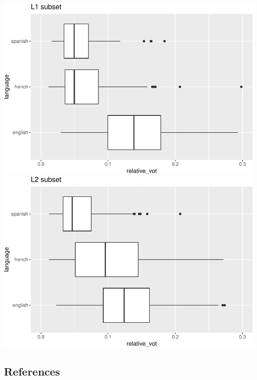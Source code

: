 \documentclass[
  12pt,
]{article}
\begin{document}
\includegraphics[width=0.5\linewidth]{caspslap_2_files/figure-latex/figures-side-1}
\includegraphics[width=0.5\linewidth]{caspslap_2_files/figure-latex/figures-side-2}

\hypertarget{references}{%
\subsection{References}\label{references}}

\begingroup
\setlength{\parindent}{-0.5in}
\setlength{\leftskip}{0.5in}
\phantom{.}

\textcolor{white}{\\} \vspace{-0.5in}
\end{document}
